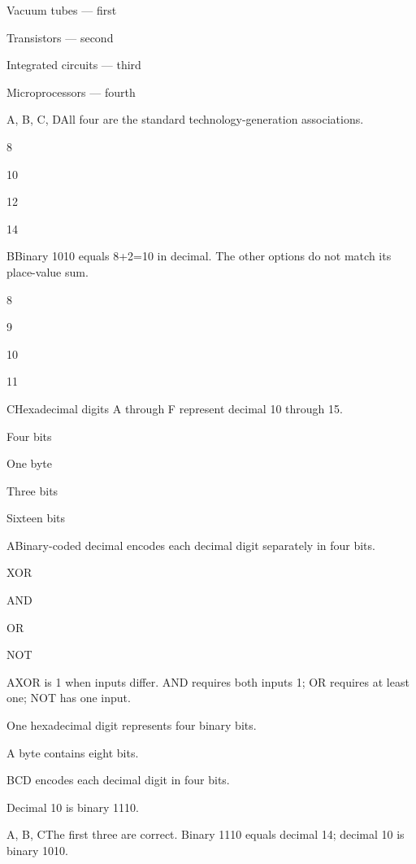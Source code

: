 \begin{enumerate}[label=\textbf{Q\arabic*.}, leftmargin=*]
  {\item Vacuum tubes --- first
   \item Transistors --- second
   \item Integrated circuits --- third
   \item Microprocessors --- fourth}
  {A, B, C, D}{All four are the standard technology-generation associations.}
\fi
\ifnum{}
  {\item 8
   \item 10
   \item 12
   \item 14}
  {B}{Binary 1010 equals 8+2=10 in decimal. The other options do not match its place-value sum.}
  {\item 8
   \item 9
   \item 10
   \item 11}
  {C}{Hexadecimal digits A through F represent decimal 10 through 15.}
  {\item Four bits
   \item One byte
   \item Three bits
   \item Sixteen bits}
  {A}{Binary-coded decimal encodes each decimal digit separately in four bits.}
  {\item XOR
   \item AND
   \item OR
   \item NOT}
  {A}{XOR is 1 when inputs differ. AND requires both inputs 1; OR requires at least one; NOT has one input.}
  {\item One hexadecimal digit represents four binary bits.
   \item A byte contains eight bits.
   \item BCD encodes each decimal digit in four bits.
   \item Decimal 10 is binary 1110.}
  {A, B, C}{The first three are correct. Binary 1110 equals decimal 14; decimal 10 is binary 1010.}
\fi
\ifnum{}

\end{enumerate}
